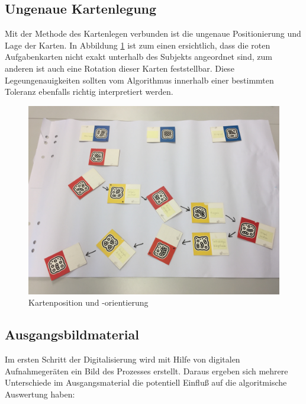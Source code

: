 \subsection{Ungenaue Kartenlegung} %
\label{ssub:ungenaue_kartenlegung}
Mit der Methode des Kartenlegen verbunden ist die ungenaue Positionierung und Lage der Karten. In Abbildung \ref{fig:karten-position} ist zum einen ersichtlich, dass die roten Aufgabenkarten nicht exakt unterhalb des Subjekts angeordnet sind, zum anderen ist auch eine Rotation dieser Karten feststellbar. Diese Legeungenauigkeiten sollten vom Algorithmus innerhalb einer bestimmten Toleranz ebenfalls richtig interpretiert werden.

\begin{figure}[h]
	\centering 
	\begin{minipage}[b]{0.8\textwidth} 
		\includegraphics[width=\textwidth]{figures/02.jpg}
		\caption{Kartenposition und -orientierung  \protect~\cite{max}} 
		\label{fig:karten-position} 
	\end{minipage}
\end{figure}

\subsection{Ausgangsbildmaterial} %
\label{sub:ausgangsbildmaterial}
Im ersten Schritt der Digitalisierung wird mit Hilfe von digitalen Aufnahmegeräten ein Bild des Prozesses erstellt. Daraus ergeben sich mehrere Unterschiede im Ausgangsmaterial die potentiell Einfluß auf die algoritmische Auswertung haben:

